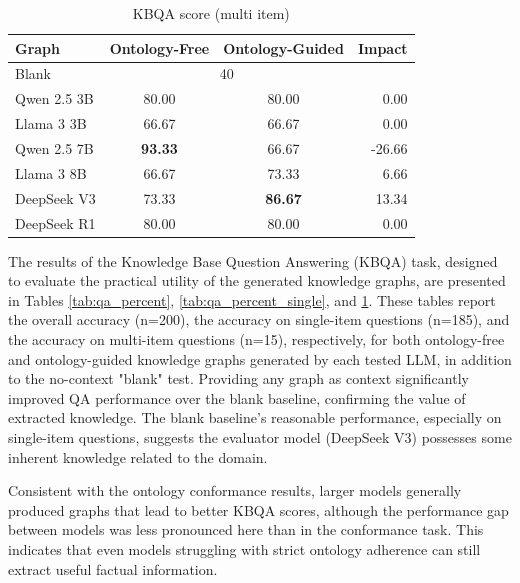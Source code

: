 \documentclass[a4, conference]{IEEEtran}
\begin{document}
\begin{table}[h]
    \centering
    \caption{KBQA score (multi item)}
    \label{tab:qa_percent_multi}
    \begin{tabular}{|l|c|c|r|}
        \hline
        Graph       & Ontology-Free            & Ontology-Guided & Impact \\
        \hline
        Blank       & \multicolumn{2}{|c|}{40} &                          \\
        \hline
        Qwen 2.5 3B & 80.00                    & 80.00           & 0.00   \\
        \hline
        Llama 3 3B  & 66.67                    & 66.67           & 0.00   \\
        \hline
        Qwen 2.5 7B & \textbf{93.33}           & 66.67           & -26.66 \\
        \hline
        Llama 3 8B  & 66.67                    & 73.33           & 6.66   \\
        \hline
        DeepSeek V3 & 73.33                    & \textbf{86.67}  & 13.34  \\
        \hline
        DeepSeek R1 & 80.00                    & 80.00           & 0.00   \\
        \hline
    \end{tabular}
\end{table}

The results of the Knowledge Base Question Answering (KBQA) task, designed to evaluate the practical utility of the generated knowledge graphs, are presented in Tables \ref{tab:qa_percent}, \ref{tab:qa_percent_single}, and \ref{tab:qa_percent_multi}. These tables report the overall accuracy (n=200), the accuracy on single-item questions (n=185), and the accuracy on multi-item questions (n=15), respectively, for both ontology-free and ontology-guided knowledge graphs generated by each tested LLM, in addition to the no-context "blank" test. Providing any graph as context significantly improved QA performance over the blank baseline, confirming the value of extracted knowledge. The blank baseline's reasonable performance, especially on single-item questions, suggests the evaluator model (DeepSeek V3) possesses some inherent knowledge related to the domain.

Consistent with the ontology conformance results, larger models generally produced graphs that lead to better KBQA scores, although the performance gap between models was less pronounced here than in the conformance task. This indicates that even models struggling with strict ontology adherence can still extract useful factual information.
\end{document}
